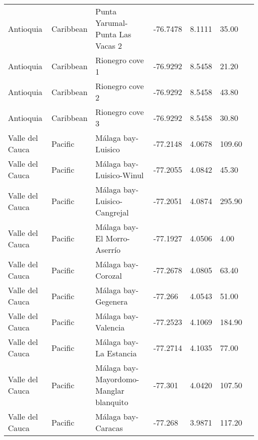 \documentclass[authoryear]{elsarticle}   	%
\begin{document}
\begin{table}[htbp]
\begin{tabular}{p{2.0cm}p{2.0cm}p{4.0cm}p{1.0cm}p{1.0cm}p{2.0cm}p{2.5cm}}
Antioquia&Caribbean&Punta Yarumal-Punta Las Vacas 2&-76.7478&8.1111&35.00&\citet{Blanco2012}\\ 
Antioquia&Caribbean&Rionegro cove 1&-76.9292&8.5458&21.20&\citet{Blanco2012}\\ 
Antioquia&Caribbean&Rionegro cove 2&-76.9292&8.5458&43.80&\citet{Blanco2012}\\ 
Antioquia&Caribbean&Rionegro cove 3&-76.9292&8.5458&30.80&\citet{Blanco2012}\\ 
Valle del Cauca&Pacific&M\'{a}laga bay-Luisico&-77.2148&4.0678&109.60&\citet{Malaga2015}\\ 
Valle del Cauca&Pacific&M\'{a}laga bay-Luisico-Winul&-77.2055&4.0842&45.30&\citet{Malaga2015}\\ 
Valle del Cauca&Pacific&M\'{a}laga bay-Luisico-Cangrejal&-77.2051&4.0874&295.90&\citet{Malaga2015}\\ 
Valle del Cauca&Pacific&M\'{a}laga bay-El Morro-Aserr\'{i}o&-77.1927&4.0506&4.00&\citet{Malaga2015}\\ 
Valle del Cauca&Pacific&M\'{a}laga bay-Corozal&-77.2678&4.0805&63.40&\citet{Malaga2015}\\ 
Valle del Cauca&Pacific&M\'{a}laga bay-Gegenera&-77.266&4.0543&51.00&\citet{Malaga2015}\\ 
Valle del Cauca&Pacific&M\'{a}laga bay-Valencia&-77.2523&4.1069&184.90&\citet{Malaga2015}\\ 
Valle del Cauca&Pacific&M\'{a}laga bay-La Estancia&-77.2714&4.1035&77.00&\citet{Malaga2015}\\ 
Valle del Cauca&Pacific&M\'{a}laga bay-Mayordomo-Manglar blanquito&-77.301&4.0420&107.50&\citet{Malaga2015}\\ 
Valle del Cauca&Pacific&M\'{a}laga bay-Caracas&-77.268&3.9871&117.20&\citet{Malaga2015}\\ 
     
               \bottomrule
   \end{tabular}
   \label{tab:SourceAGB}
\end{table}
\end{document}
